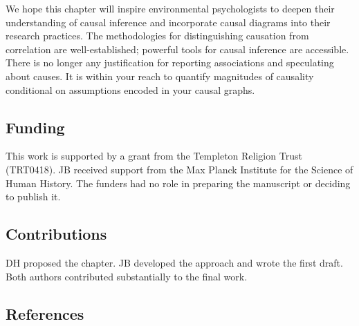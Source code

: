 \documentclass[
  singlecolumn]{article}
\begin{document}
We hope this chapter will inspire environmental psychologists to deepen
their understanding of causal inference and incorporate causal diagrams
into their research practices. The methodologies for distinguishing
causation from correlation are well-established; powerful tools for
causal inference are accessible. There is no longer any justification
for reporting associations and speculating about causes. It is within
your reach to quantify magnitudes of causality conditional on
assumptions encoded in your causal graphs.

\newpage{}

\subsection{Funding}\label{funding}

This work is supported by a grant from the Templeton Religion Trust
(TRT0418). JB received support from the Max Planck Institute for the
Science of Human History. The funders had no role in preparing the
manuscript or deciding to publish it.

\subsection{Contributions}\label{contributions}

DH proposed the chapter. JB developed the approach and wrote the first
draft. Both authors contributed substantially to the final work.

\newpage{}

\subsection{References}\label{references}
\end{document}
